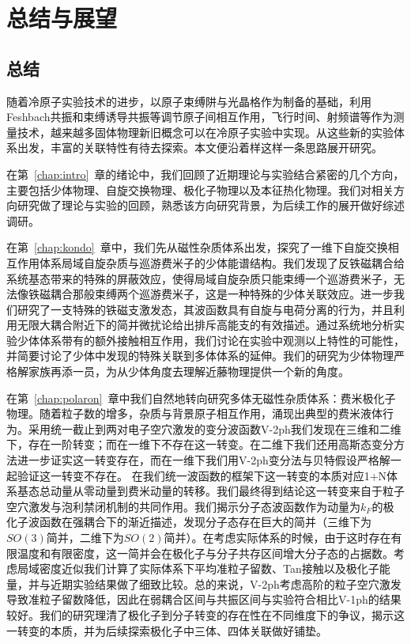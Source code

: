 \chapter{总结与展望}\label{chap:sum}

\section{总结}
随着冷原子实验技术的进步，以原子束缚阱与光晶格作为制备的基础，利用Feshbach共振和束缚诱导共振等调节原子间相互作用，飞行时间、射频谱等作为测量技术，越来越多固体物理新旧概念可以在冷原子实验中实现。从这些新的实验体系出发，丰富的关联特性有待去探索。本文便沿着样这样一条思路展开研究。

在第~\ref{chap:intro}~章的绪论中，我们回顾了近期理论与实验结合紧密的几个方向，主要包括少体物理、自旋交换物理、极化子物理以及本征热化物理。我们对相关方向研究做了理论与实验的回顾，熟悉该方向研究背景，为后续工作的展开做好综述调研。

在第~\ref{chap:kondo}~章中，我们先从磁性杂质体系出发，探究了一维下自旋交换相互作用体系局域自旋杂质与巡游费米子的少体能谱结构。我们发现了反铁磁耦合给系统基态带来的特殊的屏蔽效应，使得局域自旋杂质只能束缚一个巡游费米子，无法像铁磁耦合那般束缚两个巡游费米子，这是一种特殊的少体关联效应。进一步我们研究了一支特殊的铁磁支激发态，其波函数具有自旋与电荷分离的行为，并且利用无限大耦合附近下的简并微扰论给出排斥高能支的有效描述。通过系统地分析实验少体体系带有的额外接触相互作用，我们讨论在实验中观测以上特性的可能性，并简要讨论了少体中发现的特殊关联到多体体系的延伸。我们的研究为少体物理严格解家族再添一员，为从少体角度去理解近藤物理提供一个新的角度。

在第~\ref{chap:polaron}~章中我们自然地转向研究多体无磁性杂质体系：费米极化子物理。随着粒子数的增多，杂质与背景原子相互作用，涌现出典型的费米液体行为。采用统一截止到两对电子空穴激发的变分波函数V-2ph我们发现在三维和二维下，存在一阶转变；而在一维下不存在这一转变。在二维下我们还用高斯态变分方法进一步证实这一转变存在，而在一维下我们用V-2ph变分法与贝特假设严格解一起验证这一转变不存在。 在我们统一波函数的框架下这一转变的本质对应1+N体系基态总动量从零动量到费米动量的转移。我们最终得到结论这一转变来自于粒子空穴激发与泡利禁闭机制的共同作用。我们揭示分子态波函数作为动量为$k_F$的极化子波函数在强耦合下的渐近描述，发现分子态存在巨大的简并（三维下为$SO(3)$简并，二维下为$SO(2)简并$）。在考虑实际体系的时候，由于这时存在有限温度和有限密度，这一简并会在极化子与分子共存区间增大分子态的占据数。考虑局域密度近似我们计算了实际体系下平均准粒子留数、Tan接触以及极化子能量，并与近期实验结果做了细致比较。总的来说，V-2ph考虑高阶的粒子空穴激发导致准粒子留数降低，因此在弱耦合区间与共振区间与实验符合相比V-1ph的结果较好。我们的研究理清了极化子到分子转变的存在性在不同维度下的争议，揭示这一转变的本质，并为后续探索极化子中三体、四体关联做好铺垫。

